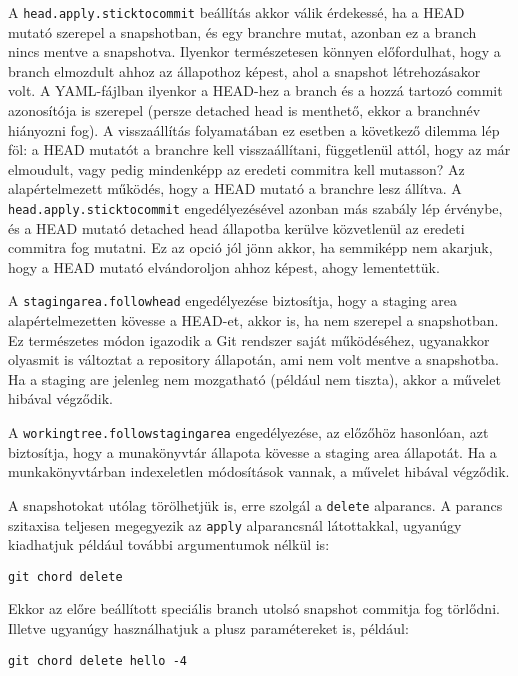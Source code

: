 \documentclass[
]{elteikthesis}[2025/03/25]
\begin{document}
A \verb|head.apply.sticktocommit| beállítás akkor válik érdekessé,
ha a HEAD mutató szerepel a snapshotban, és egy branchre mutat,
azonban ez a branch nincs mentve a snapshotva.
Ilyenkor természetesen könnyen előfordulhat, hogy a branch elmozdult ahhoz az állapothoz képest,
ahol a snapshot létrehozásakor volt.
A YAML-fájlban ilyenkor a HEAD-hez a branch és a hozzá tartozó commit azonosítója is szerepel
(persze detached head is menthető, ekkor a branchnév hiányozni fog).
A visszaállítás folyamatában ez esetben a következő dilemma lép föl:
a HEAD mutatót a branchre kell visszaállítani, függetlenül attól, hogy az már elmoudult,
vagy pedig mindenképp az eredeti commitra kell mutasson?
Az alapértelmezett működés, hogy a HEAD mutató a branchre lesz állítva.
A \verb|head.apply.sticktocommit| engedélyezésével azonban más szabály lép érvénybe,
és a HEAD mutató detached head állapotba kerülve közvetlenül az eredeti commitra fog mutatni.
Ez az opció jól jönn akkor, ha semmiképp nem akarjuk,
hogy a HEAD mutató elvándoroljon ahhoz képest, ahogy lementettük.

A \verb|stagingarea.followhead| engedélyezése biztosítja,
hogy a staging area alapértelmezetten kövesse a HEAD-et, akkor is, ha nem szerepel a snapshotban.
Ez természetes módon igazodik a Git rendszer saját működéséhez,
ugyanakkor olyasmit is változtat a repository állapotán, ami nem volt mentve a snapshotba.
Ha a staging are jelenleg nem mozgatható (például nem tiszta),
akkor a művelet hibával végződik.

A \verb|workingtree.followstagingarea| engedélyezése, az előzőhöz hasonlóan,
azt biztosítja, hogy a munakönyvtár állapota kövesse a staging area állapotát.
Ha a munkakönyvtárban indexeletlen módosítások vannak,
a művelet hibával végződik.

A snapshotokat utólag törölhetjük is, erre szolgál a \verb|delete| alparancs.
A parancs szitaxisa teljesen megegyezik az \verb|apply| alparancsnál látottakkal,
ugyanúgy kiadhatjuk például további argumentumok nélkül is:

\begin{verbatim}
git chord delete
\end{verbatim}

Ekkor az előre beállított speciális branch utolsó snapshot commitja fog törlődni.
Illetve ugyanúgy használhatjuk a plusz paramétereket is, például:

\begin{verbatim}
git chord delete hello -4
\end{verbatim}
\end{document}
